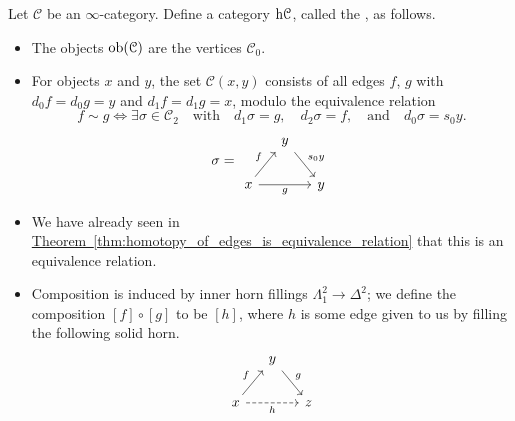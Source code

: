 \documentclass[main.tex]{subfiles}
\begin{document}
\begin{definition}
  \label{def:homotopy_category}
  Let $\mathcal{C}$ be an $\infty$-category. Define a category $\mathrm{h}\mathcal{C}$, called the , as follows.
  \begin{itemize}
    \item The objects $\operatorname{\mathrm{ob}}(\mathcal{C})$ are the vertices $\mathcal{C}_{0}$.

    \item For objects $x$ and $y$, the set $\mathcal{C}(x, y)$ consists of all edges $f$, $g$ with $d_{0}f = d_{0}g = y$ and $d_{1}f = d_{1}g = x$, modulo the equivalence relation
      \begin{equation*}
        f \sim g \iff \exists \sigma \in \mathcal{C}_{2}\quad \text{with}\quad d_{1}\sigma = g,\quad d_{2}\sigma = f, \quad \text{and}\quad d_{0}\sigma = s_{0}y.
      \end{equation*}
      \begin{equation*}
        \sigma =
        \begin{tikzcd}[column sep=small]
          & y
          \arrow[dr, "s_{0}y"]
          \\
          x
          \arrow[rr, swap, "g"]
          \arrow[ur, "f"]
          && y
        \end{tikzcd}
      \end{equation*}

    \item We have already seen in \hyperref[thm:homotopy_of_edges_is_equivalence_relation]{Theorem~\ref*{thm:homotopy_of_edges_is_equivalence_relation}} that this is an equivalence relation.

    \item Composition is induced by inner horn fillings $\Lambda^{2}_{1} \to \Delta^{2}$; we define the composition $[f] \circ [g]$ to be $[h]$, where $h$ is some edge given to us by filling the following solid horn.
      \begin{equation*}
        \begin{tikzcd}[column sep=small]
          & y
          \arrow[dr, "g"]
          \\
          x
          \arrow[ur, "f"]
          \arrow[rr, dashed, swap, "h"]
          && z
        \end{tikzcd}
      \end{equation*}


\end{itemize}
\end{definition}
\end{document}
